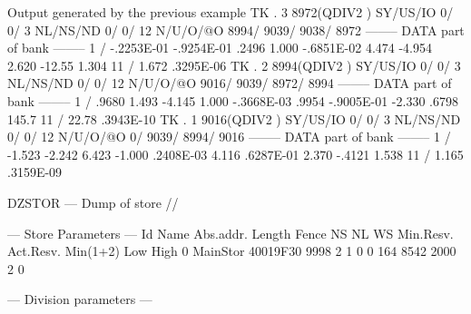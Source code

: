 \begin{Listing}{Output generated by the previous example}
 TK  .     3     8972(QDIV2   ) SY/US/IO    0/    0/   3 NL/NS/ND    0/    0/      12 N/U/O/@O    8994/    9039/    9038/    8972
--------  DATA part of bank  --------                                                                                            
      1 /  -.2253E-01  -.9254E-01   .2496       1.000      -.6851E-02   4.474      -4.954       2.620      -12.55       1.304    
     11 /   1.672       .3295E-06                                                                                                
 TK  .     2     8994(QDIV2   ) SY/US/IO    0/    0/   3 NL/NS/ND    0/    0/      12 N/U/O/@O    9016/    9039/    8972/    8994
--------  DATA part of bank  --------                                                                                            
      1 /   .9680       1.493      -4.145       1.000      -.3668E-03   .9954      -.9005E-01  -2.330       .6798       145.7    
     11 /   22.78       .3943E-10                                                                                                
 TK  .     1     9016(QDIV2   ) SY/US/IO    0/    0/   3 NL/NS/ND    0/    0/      12 N/U/O/@O       0/    9039/    8994/    9016
--------  DATA part of bank  --------                                                                                            
      1 /  -1.523      -2.242       6.423      -1.000       .2408E-03   4.116       .6287E-01   2.370      -.4121       1.538    
     11 /   1.165       .3159E-09                                                                                                
                                                                                                                                 
DZSTOR --- Dump of store //                                                                                                      
                                                                                                                                 
 --- Store Parameters ---                                                                                                        
Id    Name    Abs.addr.  Length   Fence      NS      NL      WS  Min.Resv.  Act.Resv.   Min(1+2)   Low  High                     
 0  MainStor  40019F30     9998       2       1       0       0        164       8542       2000     2     0                     
                                                                                                                                 
 --- Division parameters ---                                                                                                     
                                                                                                                                 

\end{Listing}
